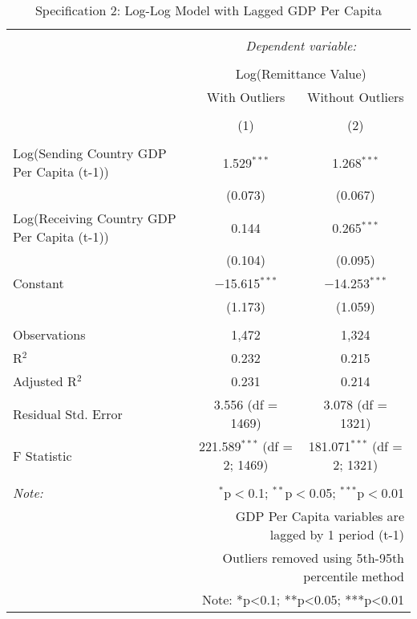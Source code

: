 
\begin{table}[!htbp] \centering 
  \caption{Specification 2: Log-Log Model with Lagged GDP Per Capita} 
  \label{} 
\begin{tabular}{@{\extracolsep{5pt}}lcc} 
\\[-1.8ex]\hline 
\hline \\[-1.8ex] 
 & \multicolumn{2}{c}{\textit{Dependent variable:}} \\ 
\cline{2-3} 
\\[-1.8ex] & \multicolumn{2}{c}{Log(Remittance Value)} \\ 
 & With Outliers & Without Outliers \\ 
\\[-1.8ex] & (1) & (2)\\ 
\hline \\[-1.8ex] 
 Log(Sending Country GDP Per Capita (t-1)) & 1.529$^{***}$ & 1.268$^{***}$ \\ 
  & (0.073) & (0.067) \\ 
  Log(Receiving Country GDP Per Capita (t-1)) & 0.144 & 0.265$^{***}$ \\ 
  & (0.104) & (0.095) \\ 
  Constant & $-$15.615$^{***}$ & $-$14.253$^{***}$ \\ 
  & (1.173) & (1.059) \\ 
 \hline \\[-1.8ex] 
Observations & 1,472 & 1,324 \\ 
R$^{2}$ & 0.232 & 0.215 \\ 
Adjusted R$^{2}$ & 0.231 & 0.214 \\ 
Residual Std. Error & 3.556 (df = 1469) & 3.078 (df = 1321) \\ 
F Statistic & 221.589$^{***}$ (df = 2; 1469) & 181.071$^{***}$ (df = 2; 1321) \\ 
\hline 
\hline \\[-1.8ex] 
\textit{Note:}  & \multicolumn{2}{r}{$^{*}$p$<$0.1; $^{**}$p$<$0.05; $^{***}$p$<$0.01} \\ 
 & \multicolumn{2}{r}{GDP Per Capita variables are lagged by 1 period (t-1)} \\ 
 & \multicolumn{2}{r}{Outliers removed using 5th-95th percentile method} \\ 
 & \multicolumn{2}{r}{Note: *p<0.1; **p<0.05; ***p<0.01} \\ 
\end{tabular} 
\end{table} 
